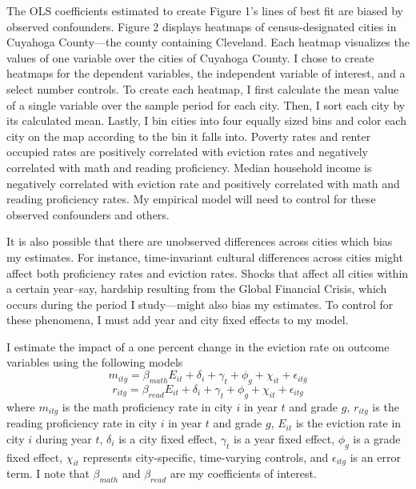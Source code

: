 \documentclass[12pt]{article}
\begin{document}
The OLS coefficients estimated to create Figure 1's lines of best fit are biased by observed confounders. Figure 2 displays heatmaps of census-designated cities in Cuyahoga County—the county containing Cleveland. Each heatmap visualizes the values of one variable over the cities of Cuyahoga County. I chose to create heatmaps for the dependent variables, the independent variable of interest, and a select number controls. To create each heatmap, I first calculate the mean value of a single variable over the sample period for each city. Then, I sort each city by its calculated mean. Lastly, I bin cities into four equally sized bins and color each city on the map according to the bin it falls into. Poverty rates and renter occupied rates are positively correlated with eviction rates and negatively correlated with math and reading proficiency. Median household income is negatively correlated with eviction rate and positively correlated with math and reading proficiency rates. My empirical model will need to control for these observed confounders and others.

It is also possible that there are unobserved differences across cities which bias my estimates. For instance, time-invariant cultural differences across cities might affect both proficiency rates and eviction rates. Shocks that affect all cities within a certain year–say, hardship resulting from the Global Financial Crisis, which occurs during the period I study—might also bias my estimates. To control for these phenomena, I must add year and city fixed effects to my model.

I estimate the impact of a one percent change in the eviction rate on outcome variables using the following models
\begin{equation}
m_{itg} = \beta_{math} E_{it} + \delta_i + \gamma_t + \phi_g + \chi_{it} + \epsilon_{itg}
\end{equation}
\begin{equation}
r_{itg} = \beta_{read} E_{it} + \delta_i + \gamma_t + \phi_g + \chi_{it} + \epsilon_{itg}
\end{equation}
where $m_{itg}$ is the math proficiency rate in city $i$ in year $t$ and grade $g$, $r_{itg}$ is the reading proficiency rate in city $i$ in year $t$ and grade $g$, $E_{it}$ is the eviction rate in  city $i$ during year $t$, $\delta_i$ is a city fixed effect, $\gamma_t$ is a year fixed effect, $\phi_g$ is a grade fixed effect, $\chi_{it}$ represents city-specific, time-varying controls, and $\epsilon_{itg}$ is an error term. I note that $\beta_{math}$ and $\beta_{read}$ are my coefficients of interest.
\end{document}

